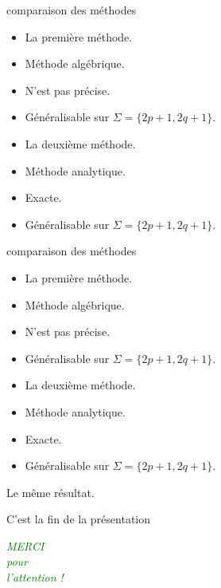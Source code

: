 \documentclass[12pt]{beamer}
\begin{document}
\begin{frame}[t]{comparaison des méthodes} 
       \begin{itemize}
  \item<alert@1-> La première méthode.
  \item Méthode algébrique.
  \item N'est pas précise.
  \item Généralisable sur $\Sigma=\{2p+1,2q+1\}$.
       \end{itemize}
       \begin{itemize}
  \item<alert@1-> La deuxième méthode.
  \item Méthode analytique.
  \item Exacte.
  \item Généralisable sur $\Sigma=\{2p+1,2q+1\}$.
       \end{itemize}
\end{frame}
\begin{frame}[t]{comparaison des méthodes} 
       \begin{itemize}
  \item<alert@1-> La première méthode.
  \item Méthode algébrique.
  \item N'est pas précise.
  \item Généralisable sur $\Sigma=\{2p+1,2q+1\}$.
       \end{itemize}
       \begin{itemize}
  \item<alert@1-> La deuxième méthode.
  \item Méthode analytique.
  \item Exacte.
  \item Généralisable sur $\Sigma=\{2p+1,2q+1\}$.
       \end{itemize}
\begin{center}
Le même résultat.
\end{center}
\end{frame}

\begin{frame}[t]{C'est la fin de la présentation}
 \begin{Huge}
  \begin{center}
    \textcolor{green}{\emph{MERCI}} \\ 
    \textcolor{green}{\emph{pour}}  \\ 
    \textcolor{green}{\emph{l'attention !}}
  \end{center}
 \end{Huge}
\end{frame}
\end{document}
